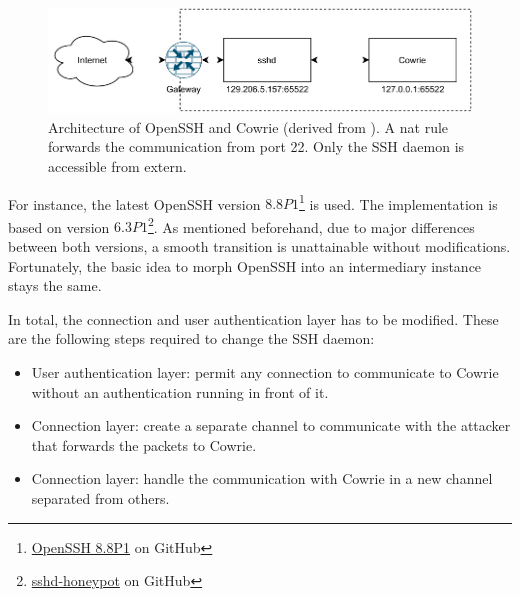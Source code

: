 \begin{figure}[htbp]
    \centering
    \includegraphics{figures/sshd-honeypot.pdf}
    \caption[Architecture of OpenSSH and Cowrie]{
        Architecture of OpenSSH and Cowrie (derived from \cite{vetterl2020}).
        A \ac{nat} rule forwards the communication from port 22.
        Only the SSH daemon is accessible from extern.
    }
    \label{fig:cowrie-fix}
\end{figure}

For instance, the latest OpenSSH version $8.8P1$\footnote{\href{https://github.com/openssh/openssh-portable/commit/bf944e3794eff5413f2df1ef37cddf96918c6bde}{OpenSSH 8.8P1} on GitHub} is used.
The implementation is based on \citet{vetterl2020} version $6.3P1$\footnote{\href{https://github.com/amv42/sshd-honeypot/commit/f58830161002baec9d3ed218e78ddb06b0d40a23}{sshd-honeypot} on GitHub}.
As mentioned beforehand, due to major differences between both versions, a smooth transition is unattainable without modifications.
Fortunately, the basic idea to morph OpenSSH into an intermediary instance stays the same.

In total, the connection and user authentication layer has to be modified.
These are the following steps required to change the SSH daemon:

\begin{itemize}
    \item User authentication layer: permit any connection to communicate to Cowrie without an authentication running in front of it.
    \item Connection layer: create a separate channel to communicate with the attacker that forwards the packets to Cowrie.
    \item Connection layer: handle the communication with Cowrie in a new channel separated from others.
\end{itemize}

